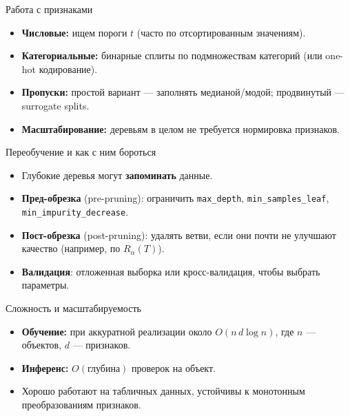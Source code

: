 \documentclass[12pt]{beamer}
\begin{document}
\begin{frame}{Работа с признаками}
	\begin{itemize}
		\item \textbf{Числовые:} ищем пороги $t$ (часто по отсортированным значениям).
		\item \textbf{Категориальные:} бинарные сплиты по подмножествам категорий (или one-hot кодирование).
		\item \textbf{Пропуски:} простой вариант — заполнять медианой/модой; продвинутый — surrogate splits.
		\item \textbf{Масштабирование:} деревьям в целом не требуется нормировка признаков.
	\end{itemize}
\end{frame}

\begin{frame}{Переобучение и как с ним бороться}
	\begin{itemize}
		\item Глубокие деревья могут \textbf{запоминать} данные.
		\item \textbf{Пред-обрезка} (pre-pruning): ограничить \texttt{max\_depth}, \texttt{min\_samples\_leaf}, \texttt{min\_impurity\_decrease}.
		\item \textbf{Пост-обрезка} (post-pruning): удалять ветви, если они почти не улучшают качество (например, по $R_\alpha(T)$).
		\item \textbf{Валидация}: отложенная выборка или кросс-валидация, чтобы выбрать параметры.
	\end{itemize}
\end{frame}

\begin{frame}{Сложность и масштабируемость}
	\begin{itemize}
		\item \textbf{Обучение:} при аккуратной реализации около $O(n\,d\log n)$, где $n$ — объектов, $d$ — признаков.
		\item \textbf{Инференс:} $O(\text{глубина})$ проверок на объект.
		\item Хорошо работают на табличных данных, устойчивы к монотонным преобразованиям признаков.
	\end{itemize}
\end{frame}
\end{document}
